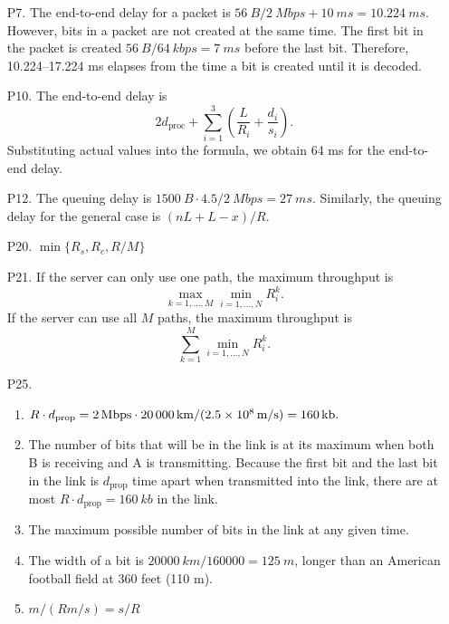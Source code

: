 \documentclass{article}
\begin{document}
\begin{enumerate}
    \item[P7.] The end-to-end delay for a packet is $\SI{56}{B} / \SI{2}{Mbps} + \SI{10}{ms} = \SI{10.224}{ms}$. However, bits in a packet are not created at the same time. The first bit in the packet is created $\SI{56}{B} / \SI{64}{kbps} = \SI{7}{ms}$ before the last bit. Therefore, 10.224--17.224 ms elapses from the time a bit is created until it is decoded.

    \item[P10.] The end-to-end delay is
    \[
        2d_\textrm{proc} + \sum_{i = 1}^3 \left(\frac{L}{R_i} + \frac{d_i}{s_i}\right).
    \]
    Substituting actual values into the formula, we obtain 64 ms for the end-to-end delay.

    \item[P12.] The queuing delay is $\SI{1500}{B} \cdot 4.5 / \SI{2}{Mbps} = \SI{27}{ms}$. Similarly, the queuing delay for the general case is $(nL + L - x)/R$.
    
    \item[P20.] $\min\{R_s, R_c, R/M\}$
    
    \item[P21.] If the server can only use one path, the maximum throughput is
    \[
        \max_{k = 1, \dots, M} \min_{i = 1, \dots, N} R_i^k.
    \]
    If the server can use all $M$ paths, the maximum throughput is
    \[
        \sum_{k = 1}^M \min_{i = 1, \dots, N} R_i^k.
    \]

    \item[P25.] \begin{enumerate}
        \item $R \cdot d_\textrm{prop} = \SI{2}{Mbps} \cdot \SI{20000}{km} / (\SI{2.5d8}{m/s}) = \SI{160}{kb}.$
        \item The number of bits that will be in the link is at its maximum when both B is receiving and A is transmitting. Because the first bit and the last bit in the link is $d_\textrm{prop}$ time apart when transmitted into the link, there are at most $R \cdot d_\textrm{prop} = \SI{160}{kb}$ in the link.
        \item The maximum possible number of bits in the link at any given time.
        \item The width of a bit is $\SI{20000}{km} / \num{160000} = \SI{125}{m}$, longer than an American football field at 360 feet (110 m).
        \item $m / (Rm/s) = s/R$
    \end{enumerate}


\end{enumerate}
\end{document}
